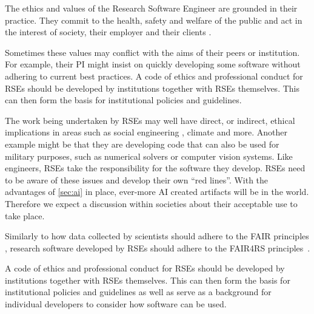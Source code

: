 \documentclass{eceasst}
\begin{document}
The ethics and values of the Research Software Engineer are grounded in their practice.
They commit to the health, safety and welfare of the public and act in the interest of society, their employer and their clients \cite{Goth2024}.

Sometimes these values may conflict with the aims of their peers or institution. For example, their PI might insist on quickly developing some software without adhering to current best practices.
A code of ethics and professional conduct for RSEs should be developed by institutions together with RSEs themselves.
This can then form the basis for institutional policies and guidelines.

The work being undertaken by RSEs may well have direct, or indirect,
ethical implications in areas such as social engineering \cite{s2erc,siadati2024},
climate \cite{Lannelongue2023} and more.
Another example might be that they are developing code that can also be used for military purposes, such as numerical solvers or computer vision systems.
Like engineers, RSEs take the responsibility for the software they develop.
RSEs need to be aware of these issues and develop their own ``red lines''.
With the advantages of \autoref{sec:ai} in place, ever-more AI created artifacts will be in the world.
Therefore we expect a discussion within societies about their acceptable use to take place.

Similarly to how data collected by scientists should adhere to the FAIR principles \cite{FAIR}, research software developed by RSEs should adhere to the FAIR4RS principles~\cite{FAIR4RS}.

A code of ethics and professional conduct for RSEs should be developed by institutions together with RSEs themselves.
This can then form the basis for institutional policies and guidelines as well as serve as a background for individual developers to consider how software can be used.
\end{document}
